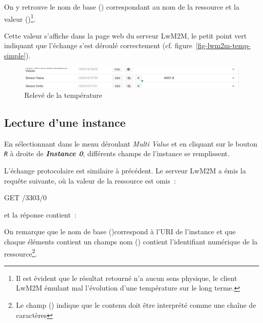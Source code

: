 On y retrouve le nom de base (\texttt{}) correspondant au nom de la ressource et la valeur (\texttt{})\footnote{Il est évident que le résultat retourné n'a aucun sens physique, le client LwM2M émulant mal l'évolution d'une température sur le long terme.}.

          \vspace{1em}

Cette valeur s'affiche dans la page web du serveur LwM2M, le petit point vert indiquant que l'échange s'est déroulé correctement (cf. figure~\vref{fig-lwm2m-temp-simple}).

\begin{figure}[tbp]
\centerline{\includegraphics[width=1\columnwidth]{Pictures/lwm2m-temp-simple.png}}
\caption{Relevé de la température}
\label{fig-lwm2m-temp-simple}
\end{figure}

\subsection{Lecture d'une instance}

En  sélectionnant  dans le menu déroulant \textit{Multi Value} et en cliquant sur le bouton \texttt{\textit{R}} à droite de \textit{\textbf{Instance 0}}, différents champs de l'instance se remplissent. 

L'échange protocolaire est similaire à précédent. Le serveur LwM2M a émis la requête suivante, où la valeur de la ressource est omis~:

\begin{termc}[backgroundcolor=\color{orange!40}, basicstyle=\ttfamily\small, escapechar=@] %
GET /3303/0
\end{termc}

\noindent et la réponse contient~:

\begin{termc}[backgroundcolor=\color{purple!30}, basicstyle=\ttfamily\small, escapechar=@] %
[{"bn":"/3303/0/","n":"5601","v":-6672.6},
{"n":"5602","v":-4573.4},
{"n":"5700","v":-6671.6},
{"n":"5701","vs":"cel"}]
\end{termc}

On remarque que le nom de base  (\texttt{})correspond à l'URI de l'instance et que chaque éléments contient un champs nom  (\texttt{}) contient l'identifiant numérique de la ressource\footnote{Le champ  (\texttt{}) indique que le contenu doit être interprété comme une chaîne de caractères}.

